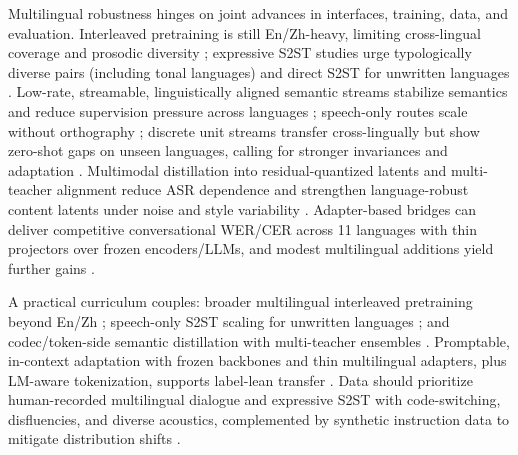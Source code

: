 \documentclass{article}
\begin{document}
Multilingual robustness hinges on joint advances in interfaces, training, data, and evaluation. Interleaved pretraining is still En/Zh-heavy, limiting cross-lingual coverage and prosodic diversity \cite{zeng2024scalingspeechtextpretrainingsyntheticint}; expressive S2ST studies urge typologically diverse pairs (including tonal languages) and direct S2ST for unwritten languages \cite{huang2023holisticcascadesystembenchmarkhumanevalu}. Low-rate, streamable, linguistically aligned semantic streams stabilize semantics and reduce supervision pressure across languages \cite{tseng2025tastetextalignedspeechtokenizationembedd}; speech-only routes scale without orthography \cite{peng2024mslms2stmultitaskspeechlanguagemodeltext}; discrete unit streams transfer cross-lingually but show zero-shot gaps on unseen languages, calling for stronger invariances and adaptation \cite{hsu2024exploringcontextlearningtextlessspeechla}. Multimodal distillation into residual-quantized latents and multi-teacher alignment reduce ASR dependence and strengthen language-robust content latents under noise and style variability \cite{ahasan2025dmcodecdistillingmultimodalrepresentatio}. Adapter-based bridges can deliver competitive conversational WER/CER across 11 languages with thin projectors over frozen encoders/LLMs, and modest multilingual additions yield further gains \cite{li2025transsionmultilingualspeechrecognitionsy}.

A practical curriculum couples: broader multilingual interleaved pretraining beyond En/Zh \cite{zeng2024scalingspeechtextpretrainingsyntheticint}; speech-only S2ST scaling for unwritten languages \cite{peng2024mslms2stmultitaskspeechlanguagemodeltext}; and codec/token-side semantic distillation with multi-teacher ensembles \cite{ahasan2025dmcodecdistillingmultimodalrepresentatio}. Promptable, in-context adaptation with frozen backbones and thin multilingual adapters, plus LM-aware tokenization, supports label-lean transfer \cite{hsu2024exploringcontextlearningtextlessspeechla,turetzky2024lastlanguagemodelawarespeechtokenization,wang2023slmbridgethingapbetweenspeechtextfoundat,xu2025optimaltransportregularizationspeechtext}. Data should prioritize human-recorded multilingual dialogue and expressive S2ST with code-switching, disfluencies, and diverse acoustics, complemented by synthetic instruction data to mitigate distribution shifts \cite{shu2023llasmlargelanguagespeechmodel,zeng2024scalingspeechtextpretrainingsyntheticint,huang2023holisticcascadesystembenchmarkhumanevalu,ahasan2025dmcodecdistillingmultimodalrepresentatio}.
\end{document}
